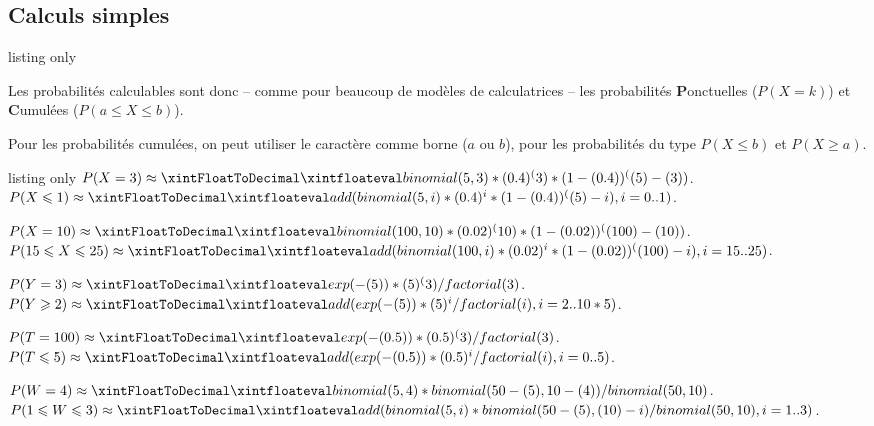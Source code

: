 \subsection{Calculs \og simples \fg}

\begin{PresCodeTexPL}{listing only}





\end{PresCodeTexPL}

\begin{cautionblock}
Les probabilités calculables sont donc -- comme pour beaucoup de modèles de calculatrices -- les probabilités \textbf{P}onctuelles ($P(X=k)$) et \textbf{C}umulées ($P(a\leqslant X\leqslant b)$).

\smallskip

Pour les probabilités cumulées, on peut utiliser le caractère \ctex{*} comme borne ($a$ ou $b$), pour les probabilités du type $P(X\leqslant b)$ et $P(X \geqslant a)$.
\end{cautionblock}

\begin{PresCodeTexPL}{listing only}
$P(X=3) \approx \CalcBinomP{5}{0.4}{3}$.
$P(X\leqslant1) \approx \CalcBinomC{5}{0.4}{*}{1}$.

$P(X=10) \approx \CalcBinomP{100}{0.02}{10}$.
$P(15\leqslant X\leqslant25) \approx \CalcBinomC{100}{0.02}{15}{25}$.

$P(Y=3) \approx \CalcPoissP{5}{3}$.
$P(Y\geqslant2) \approx \CalcPoissC{5}{2}{*}$.

$P(T=100) \approx \CalcPoissP{0.5}{3}$.
$P(T\leqslant5) \approx \CalcPoissC{0.5}{*}{5}$.

$P(W=4) \approx \CalcHypergeomP{50}{10}{5}{4}$.
$P(1\leqslant W\leqslant3) \approx \CalcHypergeomC{50}{10}{5}{1}{3}$.
\end{PresCodeTexPL}

